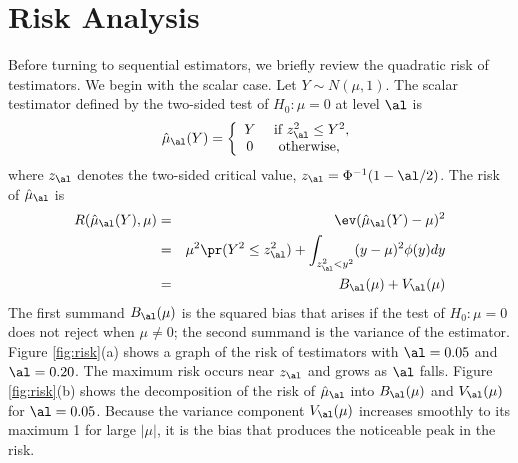 \documentclass{gSCS2e}
\begin{document}
\section{ Risk Analysis}


 Before turning to sequential estimators, we briefly review the quadratic risk
 of testimators.  We begin with the scalar case.  Let $Y \sim N(\mu,1)$.  The
 scalar testimator defined by the two-sided test of $H_0: \mu=0$ at level $\al$
 is
 \begin{equation}
   \hat\mu_\al(Y) = \left\{
     \begin{array}{cc}
        Y & \mbox{ if } z_\al^2 \le Y^2, \cr
        0 & \mbox{ otherwise, }
      \end{array} \right.
 \label{eq:muHat}
 \end{equation}
 where $z_\al$ denotes the two-sided critical value, $z_\al = \Phi^{-1}(1-\al/2)$. 
 The risk of $\hat\mu_\al$ is
 \begin{eqnarray}
   R(\hat\mu_\al(Y), \mu) 
     &=& \ev(\hat\mu_\al(Y) - \mu)^2  \cr
     &=& \mu^2 \pr(Y^2 \le z_\al^2) 
         + \int_{z_\al^2<y^2} (y-\mu)^2 \phi(y) dy \cr
     &=& B_\al(\mu) + V_\al(\mu)
 \label{eq:risk_mu_al}
 \end{eqnarray}
 The first summand $B_\al(\mu)$ is the squared bias that arises if the test of
 $H_0: \mu=0$ does not reject when $\mu \ne 0$; the second summand is the
 variance of the estimator.  Figure \ref{fig:risk}(a) shows a graph of the risk
 of testimators with $\al=0.05$ and $\al = 0.20$.  The maximum risk occurs
 near $z_\al$ and grows as $\al$ falls.  Figure \ref{fig:risk}(b) shows
 the decomposition of the risk of $\hat\mu_\al$ into $B_\al(\mu)$ and
 $V_\al(\mu)$ for $\al = 0.05$.  Because the variance component $V_\al(\mu)$
 increases smoothly to its maximum 1 for large $|\mu|$, it is the bias that
 produces the noticeable peak in the risk.
\end{document}
